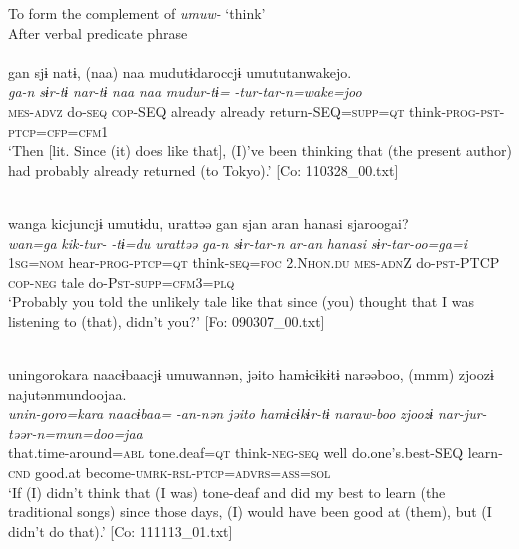\ea\label{ex:10.69}   To form the complement of \textit{umuw-} ‘think’\\
   After verbal predicate phrase\\
  \ea\relax  [= (10-52 b)]\\
      \glll    gan  sjɨ  natɨ,  (naa)  naa  mudutɨdaroccjɨ umututanwakejo.\\
      \textit{ga-n}  \textit{sɨr-tɨ}  \textit{nar-tɨ}  \textit{naa}  \textit{naa}  \textit{mudur-tɨ=} \textit{-tur-tar-n=wake=joo}\\
      \textsc{mes}-\textsc{advz}  do-\textsc{seq}  \textsc{cop}-SEQ  already  already  return-SEQ=\textsc{supp}=\textsc{qt}  think-\textsc{prog}-\textsc{pst}-\textsc{ptcp}=\textsc{cfp}=\textsc{cfm}1\\
      \glt ‘Then [lit. Since (it) does like that], (I)’ve been thinking that (the present author) had probably already returned (to Tokyo).’  [Co: 110328\_00.txt]

  \ex\relax  [= (8-41)]\\
      \glll    wanga  kicjuncjɨ  umutɨdu,  urattəə  gan  sjan  aran  hanasi  sjaroogai?\\
      \textit{wan=ga}  \textit{kik-tur-}  \textit{-tɨ=du  urattəə}   \textit{ga-n}  \textit{sɨr-tar-n}  \textit{ar-an}  \textit{hanasi}  \textit{sɨr-tar-oo=ga=i}\\
      1\textsc{sg}=\textsc{nom}  hear-\textsc{prog}-\textsc{ptcp}=\textsc{qt}  think-\textsc{seq}=\textsc{foc}  2.N\textsc{hon}.\textsc{du}  \textsc{mes}-\textsc{adn}Z  do-\textsc{pst}-PTCP  \textsc{cop}-\textsc{neg}  tale  do-P\textsc{st}-\textsc{supp}=\textsc{cfm}3=\textsc{plq}\\
      \glt       ‘Probably you told the unlikely tale like that since (you) thought that I was listening to (that), didn’t you?’ [Fo: 090307\_00.txt]

  \ex\relax [= (8-141 b)]\\
      \glll    unin{\textbar}goro{\textbar}kara  naacɨbaacjɨ  umuwannən,  jəito  hamɨcɨkɨtɨ narəəboo,  (mmm)  zjoozɨ  najutənmundoojaa.\\
      \textit{unin-goro=kara}  \textit{naacɨbaa=}  \textit{-an-nən  jəito  hamɨcɨkɨr-tɨ}   \textit{naraw-boo}    \textit{zjoozɨ}  \textit{nar-jur-təər-n=mun=doo=jaa}\\
      that.time-around=\textsc{abl}  tone.deaf=\textsc{qt}  think-\textsc{neg}-\textsc{seq}  well  do.one’s.best-SEQ  learn-\textsc{cnd}    good.at  become-\textsc{umrk}-\textsc{rsl}-\textsc{ptcp}=\textsc{advrs}=\textsc{ass}=\textsc{sol}\\
      \glt       ‘If (I) didn’t think that (I was) tone-deaf and did my best to learn (the traditional songs) since those days, (I) would have been good at (them), but (I didn’t do that).’ [Co: 111113\_01.txt]
    \z
\z

